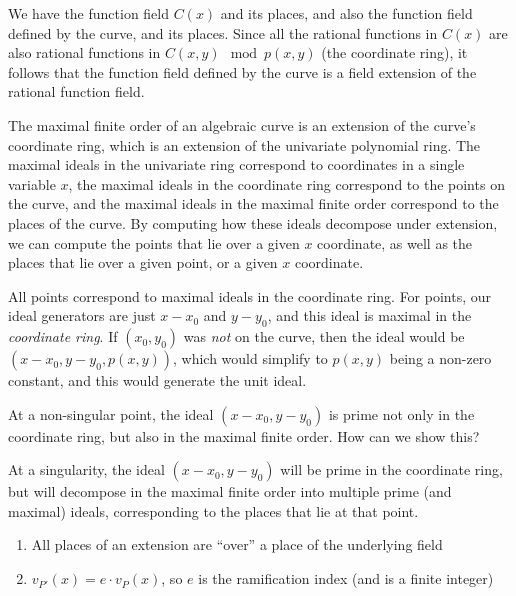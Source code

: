 We have the function field $C(x)$ and its places, and also the function field defined by the curve,
and its places.  Since all the rational functions in $C(x)$ are also rational
functions in $C(x,y) \mod p(x,y)$ (the coordinate ring), it follows that
the function field defined by the curve is a field extension of the rational function field.

The maximal finite order of an algebraic curve is an extension of the curve's coordinate ring,
which is an extension of the univariate polynomial ring.  The maximal ideals in the univariate ring
correspond to coordinates in a single variable $x$, the maximal ideals in the
coordinate ring correspond to the points on the curve, and the maximal ideals in
the maximal finite order correspond to the places of the curve.  By computing
how these ideals decompose under extension, we can compute the points that lie
over a given $x$ coordinate, as well as the places that lie over a given point,
or a given $x$ coordinate.

All points correspond to maximal ideals in the coordinate ring.
For points, our ideal generators are just $x-x_0$ and $y-y_0$, and this ideal is maximal in the {\it coordinate ring}.
If $(x_0, y_0)$ was {\it not} on the curve, then the ideal would be $(x-x_0, y-y_0, p(x,y))$, which
would simplify to $p(x,y)$ being a non-zero constant, and this would generate the unit ideal.

At a non-singular point, the ideal $(x-x_0, y-y_0)$ is prime not only in the coordinate ring,
but also in the maximal finite order.  How can we show this?

At a singularity, the ideal $(x-x_0, y-y_0)$ will be prime in the coordinate ring,
but will decompose in the maximal finite order into multiple prime (and maximal) ideals,
corresponding to the places that lie at that point.

\begin{enumerate}
\item All places of an extension are ``over'' a place of the underlying field
\item $v_{P'}(x) = e\cdot v_P(x)$, so $e$ is the ramification index (and is a finite integer)
\end{enumerate}

